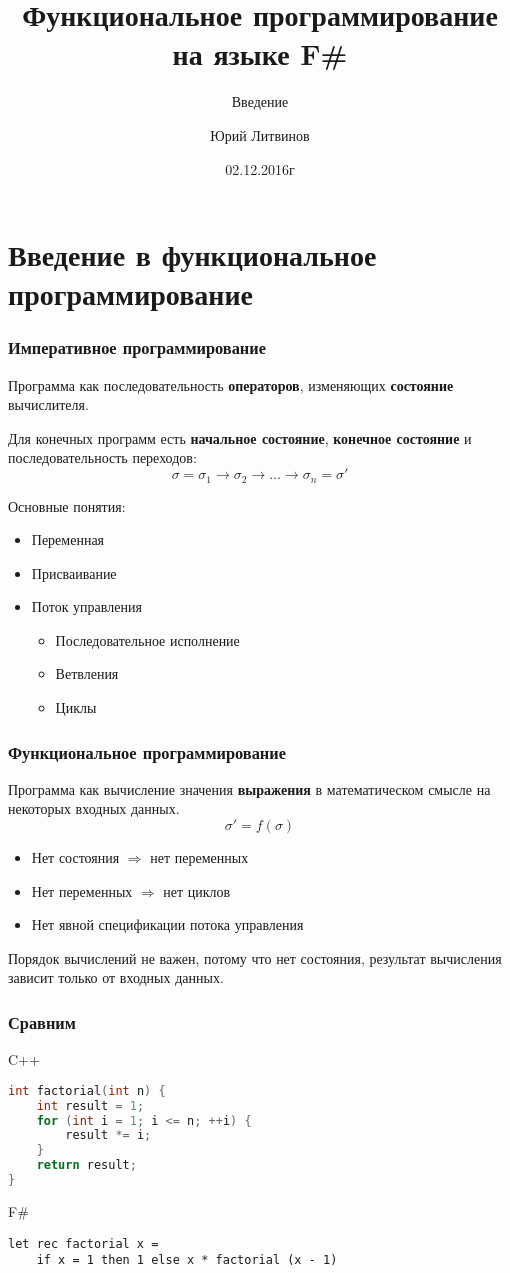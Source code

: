 \documentclass[xetex,mathserif,serif]{beamer}
\title{Функциональное программирование на языке F\#}
\subtitle{Введение}
\author{Юрий Литвинов}
\date{02.12.2016г}
\begin{document}
	
	\frame{\titlepage}
	
	\section{Введение в функциональное программирование}
	
	\begin{frame}
		\frametitle{Императивное программирование}
		Программа как последовательность \textbf{операторов}, изменяющих \textbf{состояние} вычислителя.

		Для конечных программ есть \textbf{начальное состояние}, \textbf{конечное состояние} и последовательность переходов:
		$$\sigma = \sigma_1 \rightarrow \sigma_2 \rightarrow ... \rightarrow \sigma_n = \sigma'$$
		
		Основные понятия:
		\begin{itemize}
			\item Переменная
			\item Присваивание
			\item Поток управления
			\begin{itemize}
				\item Последовательное исполнение
				\item Ветвления
				\item Циклы
			\end{itemize}
		\end{itemize}
	\end{frame}
	
	\begin{frame}
		\frametitle{Функциональное программирование}
		Программа как вычисление значения \textbf{выражения} в математическом смысле на некоторых входных данных.
		$$\sigma' = f(\sigma)$$
	
		\begin{itemize}
			\item Нет состояния $\Rightarrow$ нет переменных
			\item Нет переменных $\Rightarrow$ нет циклов
			\item Нет явной спецификации потока управления
		\end{itemize}
		Порядок вычислений не важен, потому что нет состояния, результат вычисления зависит только от входных данных.
	\end{frame}
	
	\begin{frame}[fragile]
		\frametitle{Сравним}
		\begin{alertblock}{C++}
			\begin{lstlisting}[language=C++]
int factorial(int n) {
    int result = 1;
    for (int i = 1; i <= n; ++i) {
        result *= i;
    }
    return result;
}
            \end{lstlisting}
		\end{alertblock}
		\begin{exampleblock}{F\#}
			\begin{lstlisting}
let rec factorial x =
    if x = 1 then 1 else x * factorial (x - 1)
            \end{lstlisting}
		\end{exampleblock}
\end{frame}
\end{document}
